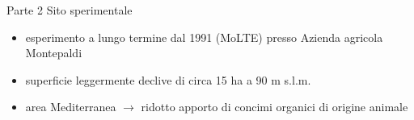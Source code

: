 \documentclass[10pt]{beamer}
\begin{document}
\begin{frame}{Parte 2 \small{Sito sperimentale}}
  \begin{minipage}[0.45\textheight]{\textwidth}
    \begin{itemize}[<+->]
    \item esperimento a lungo termine dal 1991 (MoLTE) presso Azienda
      agricola Montepaldi
    \item superficie leggermente declive di circa 15 ha a 90
      m s.l.m.
    \item area Mediterranea $\rightarrow$ ridotto apporto di concimi
      organici di origine animale
    \end{itemize}
  \end{minipage}
  \vfill
  \begin{minipage}[0.45\textheight]{\textwidth}

  \end{minipage}
\end{frame}
\end{document}
